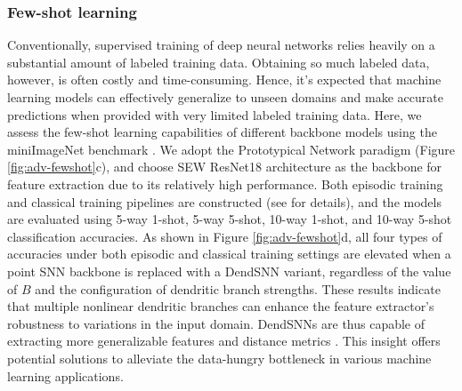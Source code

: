 \subsubsection*{Few-shot learning}

Conventionally, supervised training of deep neural networks relies heavily on a substantial amount of labeled training data. Obtaining so much labeled data, however, is often costly and time-consuming. Hence, it's expected that machine learning models can effectively generalize to unseen domains and make accurate predictions when provided with very limited labeled training data. Here, we assess the few-shot learning capabilities of different backbone models using the miniImageNet benchmark \cite{vinyals2017matching}. We adopt the Prototypical Network paradigm \cite{snell2017prototypical} (Figure \ref{fig:adv-fewshot}c), and choose SEW ResNet18 architecture \cite{fang2021sew} as the backbone for feature extraction due to its relatively high performance. Both episodic training \cite{vinyals2017matching} and classical training pipelines are constructed (see  for details), and the models are evaluated using 5-way 1-shot, 5-way 5-shot, 10-way 1-shot, and 10-way 5-shot classification accuracies. As shown in Figure \ref{fig:adv-fewshot}d, all four types of accuracies under both episodic and classical training settings are elevated when a point SNN backbone is replaced with a DendSNN variant, regardless of the value of $B$ and the configuration of dendritic branch strengths. These results indicate that multiple nonlinear dendritic branches can enhance the feature extractor's robustness to variations in the input domain. DendSNNs are thus capable of extracting more generalizable features and distance metrics \cite{snell2017prototypical}. This insight offers potential solutions to alleviate the data-hungry bottleneck in various machine learning applications.

